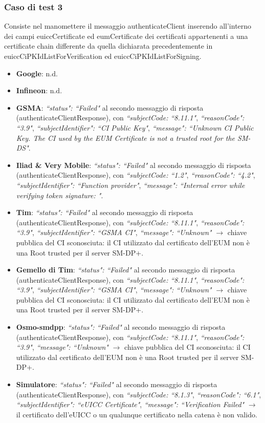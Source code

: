 \documentclass[10pt, oneside]{book}
\begin{document}
\subsubsection{Caso di test 3}
Consiste nel manomettere il messaggio authenticateClient inserendo all'interno dei campi euiccCertificate ed eumCertificate dei certificati appartenenti a una certificate chain differente da quella dichiarata precedentemente in euiccCiPKIdListForVerification ed euiccCiPKIdListForSigning.
\begin{itemize}
\item \textbf{Google}: n.d.
\item \textbf{Infineon}: n.d.
\item \textbf{GSMA}: \textit{``status": ``Failed"} al secondo messaggio di risposta (authenticateClientResponse), con \textit{``subjectCode: ``8.11.1"}, \textit{``reasonCode": ``3.9"}, \textit{``subjectIdentifier": ``CI Public Key"}, \textit{``message": ``Unknown CI Public Key. The CI used by the EUM Certificate is not a trusted root for the SM-DS"}.
\item \textbf{Iliad \& Very Mobile}: \textit{``status": ``Failed"} al secondo messaggio di risposta (authenticateClientResponse), con \textit{``subjectCode: ``1.2"}, \textit{``reasonCode": ``4.2"}, \textit{``subjectIdentifier": ``Function provider"}, \textit{``message": ``Internal error while verifying token signature: "}.
\item \textbf{Tim}: \textit{``status": ``Failed"} al secondo messaggio di risposta (authenticateClientResponse), con \textit{``subjectCode: ``8.11.1"}, \textit{``reasonCode": ``3.9"}, \textit{``subjectIdentifier": ``GSMA CI"}, \textit{``message": ``Unknown"} $\rightarrow$ chiave pubblica del CI sconosciuta: il CI utilizzato dal certificato dell'EUM non è una Root trusted per il server SM-DP+.
\item \textbf{Gemello di Tim}: \textit{``status": ``Failed"} al secondo messaggio di risposta (authenticateClientResponse), con \textit{``subjectCode: ``8.11.1"}, \textit{``reasonCode": ``3.9"}, \textit{``subjectIdentifier": ``GSMA CI"}, \textit{``message": ``Unknown"} $\rightarrow$ chiave pubblica del CI sconosciuta: il CI utilizzato dal certificato dell'EUM non è una Root trusted per il server SM-DP+.
\item \textbf{Osmo-smdpp}: \textit{``status": ``Failed"} al secondo messaggio di risposta (authenticateClientResponse), con \textit{``subjectCode: ``8.11.1"}, \textit{``reasonCode": ``3.9"}, \textit{``message": ``Unknown"} $\rightarrow$ chiave pubblica del CI sconosciuta: il CI utilizzato dal certificato dell'EUM non è una Root trusted per il server SM-DP+.
\item \textbf{Simulatore}: \textit{``status": ``Failed"} al secondo messaggio di risposta (authenticateClientResponse), con \textit{``subjectCode: ``8.1.3"}, \textit{``reasonCode": ``6.1"}, \textit{``subjectIdentifier": ``eUICC Certificate"}, \textit{``message": ``Verification Failed"} $\rightarrow$ il certificato dell'eUICC o un qualunque certificato nella catena è non valido.
\end{itemize}
\end{document}
